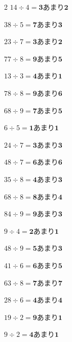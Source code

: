 \documentclass[paper=a4, fontsize=11pt, jafontsize=11pt]{jlreq}
\begin{document}
\vspace*{3ex}
\begin{multicols*}{2}
$ 14 \div 4 = \bm{3} 　あまり　 \bm{2}$ \vspace*{\fill} 

$ 38 \div 5 = \bm{7} 　あまり　 \bm{3}$ \vspace*{\fill} 

$ 23 \div 7 = \bm{3} 　あまり　 \bm{2}$ \vspace*{\fill} 

$ 77 \div 8 = \bm{9} 　あまり　 \bm{5}$ \vspace*{\fill} 

$ 13 \div 3 = \bm{4} 　あまり　 \bm{1}$ \vspace*{\fill} 

$ 78 \div 8 = \bm{9} 　あまり　 \bm{6}$ \vspace*{\fill} 

$ 68 \div 9 = \bm{7} 　あまり　 \bm{5}$ \vspace*{\fill} 

$ 6 \div 5 = \bm{1} 　あまり　 \bm{1}$ \vspace*{\fill} 

$ 24 \div 7 = \bm{3} 　あまり　 \bm{3}$ \vspace*{\fill} 

$ 48 \div 7 = \bm{6} 　あまり　 \bm{6}$ \vspace*{\fill} 

\columnbreak 
$ 35 \div 8 = \bm{4} 　あまり　 \bm{3}$ \vspace*{\fill} 

$ 68 \div 8 = \bm{8} 　あまり　 \bm{4}$ \vspace*{\fill} 

$ 84 \div 9 = \bm{9} 　あまり　 \bm{3}$ \vspace*{\fill} 

$ 9 \div 4 = \bm{2} 　あまり　 \bm{1}$ \vspace*{\fill} 

$ 48 \div 9 = \bm{5} 　あまり　 \bm{3}$ \vspace*{\fill} 

$ 41 \div 6 = \bm{6} 　あまり　 \bm{5}$ \vspace*{\fill} 

$ 63 \div 8 = \bm{7} 　あまり　 \bm{7}$ \vspace*{\fill} 

$ 28 \div 6 = \bm{4} 　あまり　 \bm{4}$ \vspace*{\fill} 

$ 19 \div 2 = \bm{9} 　あまり　 \bm{1}$ \vspace*{\fill} 

$ 9 \div 2 = \bm{4} 　あまり　 \bm{1}$ \vspace*{\fill} 

\end{multicols*}
\end{document}
